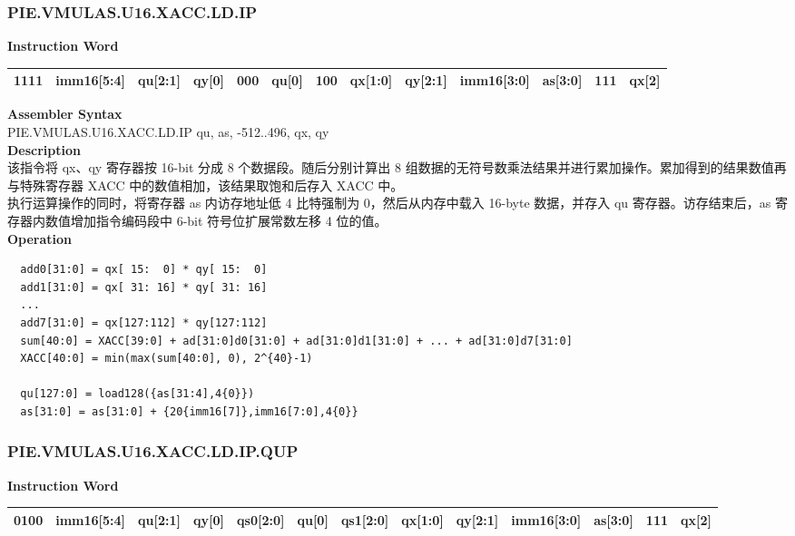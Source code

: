 \newpage
\subsubsection{PIE.VMULAS.U16.XACC.LD.IP}\label{instruction:PIEVMULASU16XACCLDIP}
\setlength\tabcolsep{6pt}
\textbf{Instruction Word} \\
\begin{tabular}{|c|c|c|c|c|c|c|c|c|c|c|c|c|}
	\hline
	1111 & imm16[5:4] & qu[2:1] & qy[0] & 000 & qu[0] & 100 & qx[1:0] & qy[2:1] & imm16[3:0] & as[3:0] & 111 & qx[2] \\
	\hline
\end{tabular}

\textbf{Assembler Syntax} \\
PIE.VMULAS.U16.XACC.LD.IP qu, as, -512..496, qx, qy \\
\textbf{Description} \\
该指令将 qx、qy 寄存器按 16-bit 分成 8 个数据段。随后分别计算出 8 组数据的无符号数乘法结果并进行累加操作。累加得到的结果数值再与特殊寄存器 XACC 中的数值相加，该结果取饱和后存入 XACC 中。\\ 执行运算操作的同时，将寄存器 as 内访存地址低 4 比特强制为 0，然后从内存中载入 16-byte 数据，并存入 qu 寄存器。访存结束后，as 寄存器内数值增加指令编码段中 6-bit 符号位扩展常数左移 4 位的值。\\
\textbf{Operation}
\begin{lstlisting}
  add0[31:0] = qx[ 15:  0] * qy[ 15:  0]
  add1[31:0] = qx[ 31: 16] * qy[ 31: 16]
  ...
  add7[31:0] = qx[127:112] * qy[127:112]
  sum[40:0] = XACC[39:0] + ad[31:0]d0[31:0] + ad[31:0]d1[31:0] + ... + ad[31:0]d7[31:0]
  XACC[40:0] = min(max(sum[40:0], 0), 2^{40}-1)

  qu[127:0] = load128({as[31:4],4{0}})
  as[31:0] = as[31:0] + {20{imm16[7]},imm16[7:0],4{0}}
\end{lstlisting}

\newpage
\subsubsection{PIE.VMULAS.U16.XACC.LD.IP.QUP}\label{instruction:PIEVMULASU16XACCLDIPQUP}
\setlength\tabcolsep{5pt}
\textbf{Instruction Word} \\
\begin{tabular}{|c|c|c|c|c|c|c|c|c|c|c|c|c|}
	\hline
	0100 & imm16[5:4] & qu[2:1] & qy[0] & qs0[2:0] & qu[0] & qs1[2:0] & qx[1:0] & qy[2:1] & imm16[3:0] & as[3:0] & 111 & qx[2] \\
	\hline
\end{tabular}

